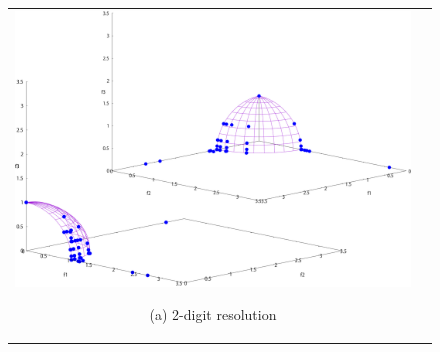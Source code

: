 \documentclass[../main/main]{subfiles}
\begin{document}
\begin{figure}[htbp]
\begin{tabular}{cc}
\begin{minipage}{0.32\hsize}
\includegraphics[width=1\linewidth]{../figures/MOEAD/DTLZ4_digi2_double.pdf}
\begin{center}
{\footnotesize (a) 2-digit resolution}
\end{center}
\end{minipage}
\end{tabular}
\end{figure}
\end{document}
